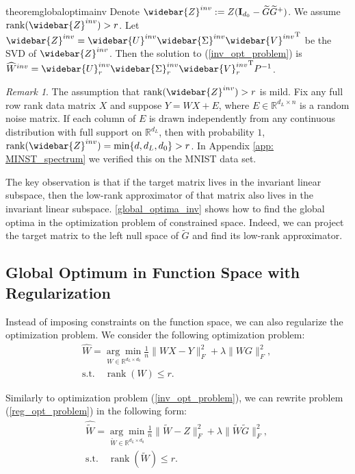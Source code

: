 \documentclass{article}
\newcommand{\T}{\mathrm{T}}
\newcommand{\R}{\mathbb{R}}
\theoremstyle{plain}
\theoremstyle{definition}
\theoremstyle{remark}
\newtheorem{remark}[theorem]{Remark}
\theoremstyle{remark}
\begin{document}
\begin{restatable}{theorem}{globaloptimainv}
\label{global_optima_inv}
Denote $\widebar{Z}^{inv} := Z(\mathbf{I}_{d_0}-\widetilde{G} \widetilde{G}^{+})$. We assume $\operatorname*{rank}(\widebar{Z}^{inv}) > r$. Let $\widebar{Z}^{inv} = \widebar{U}^{inv} \widebar{\Sigma}^{inv} {\widebar{V}^{inv}}^{\T}$ be the SVD of $\widebar{Z}^{inv}$. Then the solution to 
(\ref{inv_opt_problem}) is $\widehat{W}^{inv} = \widebar{U}^{inv}_{r} \widebar{\Sigma}^{inv}_{r} {\widebar{V}^{inv}_{r}}^{\T} P^{-1}$.
\end{restatable}

\begin{remark} \label{remark:full_rank}
  The assumption that $\operatorname*{rank}(\widebar{Z}^{inv}) > r$ is mild. Fix any full row rank data matrix $X$ and suppose $Y = WX + E$, where $E \in \R^{d_L \times n}$ is a random noise matrix. If each column of $E$ is drawn independently from any continuous distribution with full support on $\R^{d_L}$, then with probability $1$, $\operatorname*{rank}(\widebar{Z}^{inv}) =\min\{d, d_L, d_0\} > r$. In Appendix \ref{app: MINST_spectrum} we verified this on the MNIST data set.
\end{remark}

The key observation is that if the target matrix lives in the invariant linear subspace, then the low-rank approximator of that matrix also lives in the invariant linear subspace. \autoref{global_optima_inv} shows how to find the global optima in the optimization problem of constrained space. 
Indeed, we can project the target matrix to the left null space of $\widetilde{G}$ and find its low-rank approximator. 

\subsection{Global Optimum in Function Space with Regularization}

Instead of imposing constraints on the function space, we can also regularize the optimization problem. We consider the following optimization problem: 
\begin{align} \label{reg_opt_problem}
  & \widehat{W} = \underset{W \in \mathbb{R}^{d_L \times d_0}}{\arg \min} \frac{1}{n}\|WX - Y\|_F^2 + \lambda \|WG\|_F^2, \quad \nonumber \\
  & \text{s.t.} \quad \operatorname*{rank}(W) \leq r.
\end{align}

Similarly to optimization problem (\ref{inv_opt_problem}), we can rewrite problem (\ref{reg_opt_problem}) in the following form: 
\begin{align} \label{inv_opt_problem_rewrite}
  & \widehat{\widetilde{W}} = \underset{\widetilde{W} \in \mathbb{R}^{d_L \times d_0}}{\arg \min} \frac{1}{n} \|\widetilde{W} - Z\|_F^2 + \lambda \|\widetilde{W}\widetilde{G}\|_F^2, \quad \nonumber \\
  & \text{s.t.} \quad \operatorname*{rank}(\widetilde{W}) \leq r.
\end{align}
\end{document}
